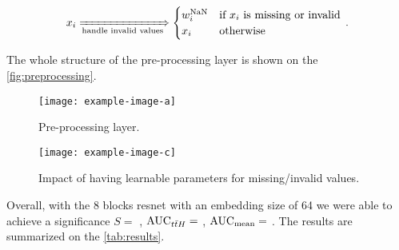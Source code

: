 \begin{equation}
    x_i \xRightarrow[\text{handle invalid values}]{} \begin{cases}
        w^\text{NaN}_i & \text{if } x_i \text{ is missing or invalid} \\
        x_i            & \text{otherwise}
    \end{cases}\,.
\end{equation}


The whole structure of the pre-processing layer is shown on the \autoref{fig:preprocessing}.

\begin{figure}[htb]
    \centering
    \texttt{[image: example-image-a]}
    \caption{Pre-processing layer.}
    \label{fig:preprocessing}
\end{figure}


\begin{figure}[htb]
    \centering
    \texttt{[image: example-image-c]}
    \caption{Impact of having learnable parameters for missing/invalid values.}
    \label{fig:learnable-nan-w}
\end{figure}

Overall, with the 8 blocks \gls{resnet} with an embedding size of 64 we were able to achieve a significance $S = $
, $\text{AUC}_{t\bar{t}H} = $ , $\text{AUC}_\text{mean} = $ . The results are summarized on the
\autoref{tab:results}.